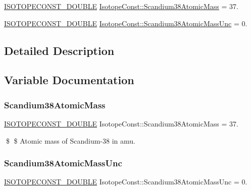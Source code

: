 \begin{DoxyCompactItemize}
\item 
\mbox{\hyperlink{group___isotope_const-_macros_ga8f45a7272ce02c0b4c65c44636ed719a}{I\+S\+O\+T\+O\+P\+E\+C\+O\+N\+S\+T\+\_\+\+D\+O\+U\+B\+LE}} \mbox{\hyperlink{group___isotope_const-_scandium-_sc38_gadcea3f67d71e0ea441dcbb4dcabc337b}{Isotope\+Const\+::\+Scandium38\+Atomic\+Mass}} = 37.
\item 
\mbox{\hyperlink{group___isotope_const-_macros_ga8f45a7272ce02c0b4c65c44636ed719a}{I\+S\+O\+T\+O\+P\+E\+C\+O\+N\+S\+T\+\_\+\+D\+O\+U\+B\+LE}} \mbox{\hyperlink{group___isotope_const-_scandium-_sc38_ga02f23ddd3b0706e69a6c90143a86fd65}{Isotope\+Const\+::\+Scandium38\+Atomic\+Mass\+Unc}} = 0.
\end{DoxyCompactItemize}


\subsection{Detailed Description}


\subsection{Variable Documentation}
\mbox{\label{group___isotope_const-_scandium-_sc38_gadcea3f67d71e0ea441dcbb4dcabc337b}} 
\subsubsection{\texorpdfstring{Scandium38\+Atomic\+Mass}{Scandium38AtomicMass}}
{\footnotesize\ttfamily \mbox{\hyperlink{group___isotope_const-_macros_ga8f45a7272ce02c0b4c65c44636ed719a}{I\+S\+O\+T\+O\+P\+E\+C\+O\+N\+S\+T\+\_\+\+D\+O\+U\+B\+LE}} Isotope\+Const\+::\+Scandium38\+Atomic\+Mass = 37.}

\$ \$ Atomic mass of Scandium-\/38 in amu. \mbox{\label{group___isotope_const-_scandium-_sc38_ga02f23ddd3b0706e69a6c90143a86fd65}} 
\subsubsection{\texorpdfstring{Scandium38\+Atomic\+Mass\+Unc}{Scandium38AtomicMassUnc}}
{\footnotesize\ttfamily \mbox{\hyperlink{group___isotope_const-_macros_ga8f45a7272ce02c0b4c65c44636ed719a}{I\+S\+O\+T\+O\+P\+E\+C\+O\+N\+S\+T\+\_\+\+D\+O\+U\+B\+LE}} Isotope\+Const\+::\+Scandium38\+Atomic\+Mass\+Unc = 0.}

